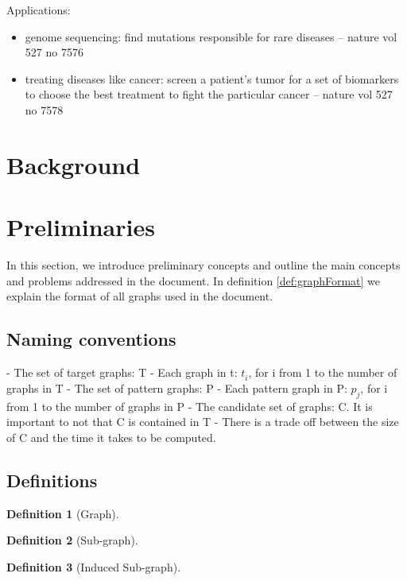 \documentclass{l4proj}
\theoremstyle{definition}
\newtheorem{myDef}{Definition}
\begin{document}
        Applications:
        \begin{itemize}
        \item genome sequencing: find mutations responsible for rare diseases -- nature vol 527 no 7576
        \item treating diseases like cancer: screen a patient's tumor for a set of biomarkers to choose the best treatment to fight the particular cancer -- nature vol 527 no 7578
        \end{itemize}
\section{Background}
        
        
\section{Preliminaries}
        In this section, we introduce preliminary concepts and outline the main concepts and problems addressed in the document. In definition \ref{def:graphFormat} we explain the format of all graphs used in the document.
        
    \subsection{Naming conventions}
    \label{naming}
    - The set of target graphs: T
    - Each graph in t: $t^{}_i$, for i from 1 to the number of graphs in T
    - The set of pattern graphs: P
    - Each pattern graph in P: $p^{}_j$, for i from 1 to the number of graphs in P
    - The candidate set of graphs: C. It is important to not that C is contained in T
    - There is a trade off between the size of C and the time it takes to be computed.
        
	\subsection{Definitions}
    \label{subsec:definitions}
        \begin{myDef}[Graph]
        
        \end{myDef}
        
        \begin{myDef}[Sub-graph]
        \label{def:subgraph}
        
        \end{myDef}
        
        \begin{myDef}[Induced Sub-graph]
        \label{def:induced-subgraph}
        
        \end{myDef}
    
\end{document}
